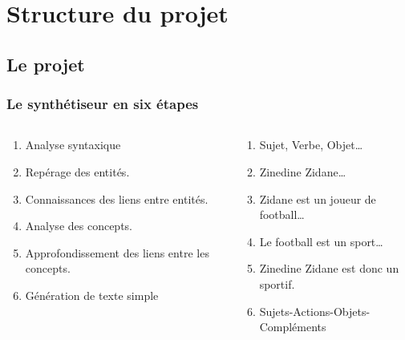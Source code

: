 \documentclass{beamer}
\begin{document}
\section{Structure du projet}

\subsection{Le projet}
\begin{frame}
\frametitle{Le synthétiseur en six étapes}

\begin{columns}[t]

\begin{column}{6cm}
\begin{enumerate}
 \item Analyse syntaxique
 \item Repérage des entités.
 \item Connaissances des liens entre entités.
 \item Analyse des concepts.
 \item Approfondissement des liens entre les concepts.
 \item Génération de texte simple
\end{enumerate}
\end{column}

\begin{column}{6cm}
\begin{enumerate}
\item Sujet, Verbe, Objet\ldots{}
\item Zinedine Zidane\ldots{}
\item Zidane est un joueur de football\ldots{}
\item Le football est un sport\ldots{}
\item Zinedine Zidane est donc un sportif.
\item Sujets-Actions-Objets-Compléments
\end{enumerate}

\end{column}
\end{columns}

\end{frame}
\end{document}
